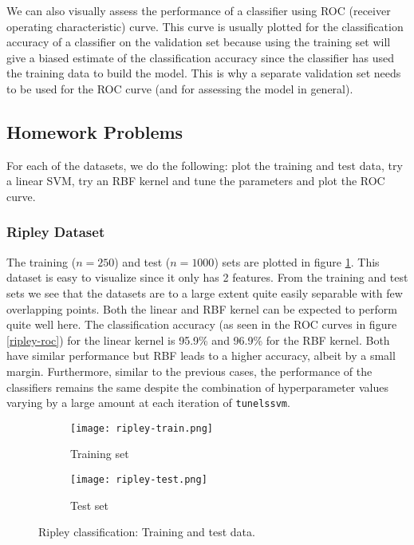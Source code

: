 \documentclass[paper=a4, fontsize=11pt]{scrartcl} %
\numberwithin{equation}{section} %
\begin{document}
We can also visually assess the performance of a classifier using ROC (receiver operating characteristic) curve. This curve is usually plotted for the classification accuracy of a classifier on the validation set because using the training set will give a biased estimate of the classification accuracy since the classifier has used the training data to build the model. This is why a separate validation set needs to be used for the ROC curve (and for assessing the model in general).

\subsection{Homework Problems}

For each of the datasets, we do the following: plot the training and test data, try a linear SVM, try an RBF kernel and tune the parameters and plot the ROC curve. 

\subsubsection{Ripley Dataset}

The training ($n = 250$) and test ($n = 1000$)  sets are plotted in figure \ref{ripley-data}. This dataset is easy to visualize since it only has 2 features. From the training and test sets we see that the datasets are to a large extent quite easily separable with few overlapping points. Both the linear and RBF kernel can be expected to perform quite well here. The classification accuracy (as seen in the ROC curves in figure \ref{ripley-roc}) for the linear kernel is 95.9\% and 96.9\% for the RBF kernel. Both have similar performance but RBF leads to a higher accuracy, albeit by a small margin. Furthermore, similar to the previous cases, the performance of the classifiers remains the same despite the combination of hyperparameter values varying by a large amount at each iteration of \texttt{tunelssvm}.

\begin{figure}[ht]
\centering
	\begin{subfigure}[b]{0.5\textwidth}
		\centering
		\texttt{[image: ripley-train.png]}
		\caption{Training set}
	\end{subfigure}%
	\begin{subfigure}[b]{0.5\textwidth}
		\centering
		\texttt{[image: ripley-test.png]}
		\caption{Test set}
	\end{subfigure}
\caption{Ripley classification: Training and test data.}
\label{ripley-data}
\end{figure}
\end{document}
